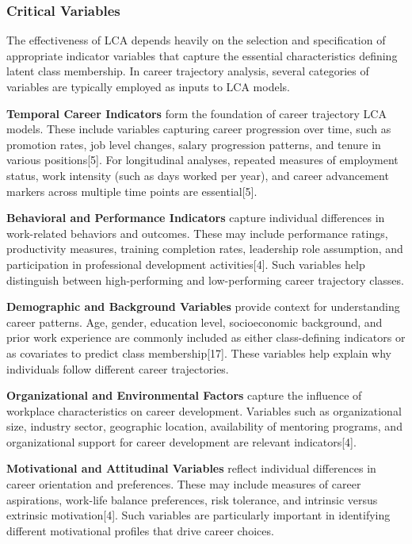 \documentclass[main.tex]{subfiles}
\begin{document}
\subsubsection{Critical Variables}

The effectiveness of LCA depends heavily on the selection and specification of appropriate indicator variables that capture the essential characteristics defining latent class membership. In career trajectory analysis, several categories of variables are typically employed as inputs to LCA models.

\textbf{Temporal Career Indicators} form the foundation of career trajectory LCA models. These include variables capturing career progression over time, such as promotion rates, job level changes, salary progression patterns, and tenure in various positions[5]. For longitudinal analyses, repeated measures of employment status, work intensity (such as days worked per year), and career advancement markers across multiple time points are essential[5].

\textbf{Behavioral and Performance Indicators} capture individual differences in work-related behaviors and outcomes. These may include performance ratings, productivity measures, training completion rates, leadership role assumption, and participation in professional development activities[4]. Such variables help distinguish between high-performing and low-performing career trajectory classes.

\textbf{Demographic and Background Variables} provide context for understanding career patterns. Age, gender, education level, socioeconomic background, and prior work experience are commonly included as either class-defining indicators or as covariates to predict class membership[17]. These variables help explain why individuals follow different career trajectories.

\textbf{Organizational and Environmental Factors} capture the influence of workplace characteristics on career development. Variables such as organizational size, industry sector, geographic location, availability of mentoring programs, and organizational support for career development are relevant indicators[4].

\textbf{Motivational and Attitudinal Variables} reflect individual differences in career orientation and preferences. These may include measures of career aspirations, work-life balance preferences, risk tolerance, and intrinsic versus extrinsic motivation[4]. Such variables are particularly important in identifying different motivational profiles that drive career choices.
\end{document}
